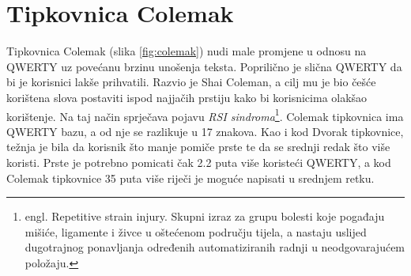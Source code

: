 \documentclass[times, utf8, zavrsni, numeric]{fer}
\begin{document}
\section{Tipkovnica Colemak}
Tipkovnica Colemak (slika \ref{fig:colemak}) nudi male promjene u odnosu na QWERTY uz povećanu brzinu unošenja teksta. Poprilično je slična QWERTY da bi je korisnici lakše prihvatili. Razvio je Shai Coleman, a cilj mu je bio češće korištena slova postaviti ispod najjačih prstiju kako bi korisnicima olakšao korištenje. Na taj način sprječava pojavu \emph{RSI sindroma}\footnote{engl. Repetitive strain injury. Skupni izraz za grupu bolesti koje pogađaju mišiće, ligamente i živce u oštećenom području tijela, a nastaju uslijed dugotrajnog ponavljanja određenih automatiziranih radnji u neodgovarajućem položaju.}. Colemak tipkovnica ima QWERTY bazu, a od nje se razlikuje u 17 znakova. Kao i kod Dvorak tipkovnice, težnja je bila da korisnik što manje pomiče prste te da se srednji redak što više koristi. Prste je potrebno pomicati čak 2.2 puta više koristeći QWERTY, a kod Colemak tipkovnice 35 puta više riječi je moguće napisati u srednjem retku.
\end{document}
